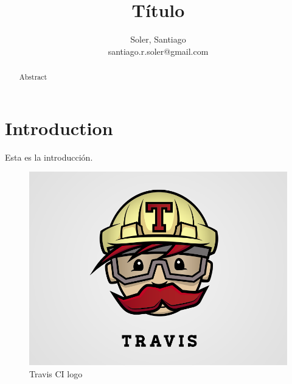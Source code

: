 \documentclass[a4paper,11pt,twoside]{article}
\begin{document}
\title{\bf Título}
\author{Soler, Santiago \\{\small santiago.r.soler@gmail.com }}
\date{}

\vspace{-1cm}
\maketitle
\vspace{-1cm}

\begin{abstract}
Abstract
\end{abstract}


\section{Introduction}

Esta es la introducción.

\begin{figure}[h]
\centering
\includegraphics[width=\textwidth]{figs/travis.png}
\caption{Travis CI logo}
\end{figure}
\end{document}
